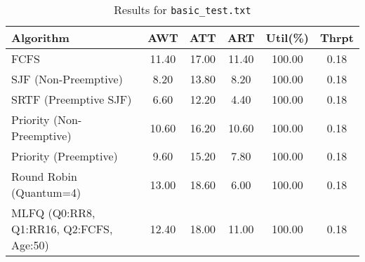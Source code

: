 \documentclass[12pt]{article}
\begin{document}
\begin{table}[htbp]
\centering
\caption{Results for \texttt{basic\_test.txt}}
\label{tab:basic_results}
\footnotesize
\begin{tabular}{@{}l S[table-format=3.2] S[table-format=3.2] S[table-format=3.2] S[table-format=3.2] S[table-format=1.2]@{}}
\toprule
Algorithm                                     & {AWT} & {ATT} & {ART} & {Util(\%)} & {Thrpt}\\
\midrule
FCFS                                         & 11.40         & 17.00            & 11.40          & 100.00          & 0.18 \\
SJF (Non-Preemptive)                         & 8.20          & 13.80            & 8.20           & 100.00          & 0.18 \\
SRTF (Preemptive SJF)                        & 6.60          & 12.20            & 4.40           & 100.00          & 0.18 \\
Priority (Non-Preemptive)                    & 10.60         & 16.20            & 10.60          & 100.00          & 0.18 \\
Priority (Preemptive)                        & 9.60          & 15.20            & 7.80           & 100.00          & 0.18 \\
Round Robin (Quantum=4)                      & 13.00         & 18.60            & 6.00           & 100.00          & 0.18 \\
MLFQ (Q0:RR8, Q1:RR16, Q2:FCFS, Age:50)      & 12.40         & 18.00            & 11.00          & 100.00          & 0.18 \\
\bottomrule
\end{tabular}
\end{table}
\end{document}
